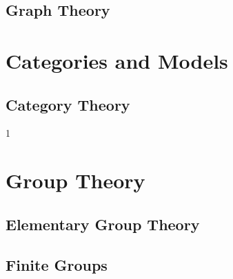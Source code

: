 \documentclass{book}                                                           %
\newcommand*{\TOPPATH}{books}
\newcommand*{\PARPATH}{\TOPPATH/}
\newcommand*{\PATH}{\TOPPATH/}
\newcounter{endpage}
\def\compilealgebra{1}
\begin{document}
                \chapter{Graph Theory}
                    \renewcommand{\PATH}{\PARPATH/Graph_Theory}
                    \label{chapt:Graph_Theory}%
                    
            \part{Categories and Models}
                \renewcommand{\PARPATH}{\TOPPATH/Foundations/Categories_and_Models}
                \chapter{Category Theory}
                    \renewcommand{\PATH}{\PARPATH}
                    \label{chapt:Category_Theory}%
                    
        \clearpage
        \setcounter{endpage}{\thepage}
    \else
        \setcounter{book}{1}
        \setcounter{part}{3}
        \setcounter{chapter}{10}
    \fi

    \if\compilealgebra1
            \label{book:Algebra}%
            \setcounter{page}{\value{endpage}}
            \part{Group Theory}
                \renewcommand{\PARPATH}{\TOPPATH/Algebra/Group_Theory}
                \chapter{Elementary Group Theory}
                    \renewcommand{\PATH}{\PARPATH/Elementary_Group_Theory}
                    \label{chapt:Elementary_Group_Theory}%
                    
                    
                    
                \chapter{Finite Groups}
                    \renewcommand{\PATH}{\PARPATH/Finite_Groups}
                    \label{chapt:Finite_Groups}%
                    
                    
\end{document}
